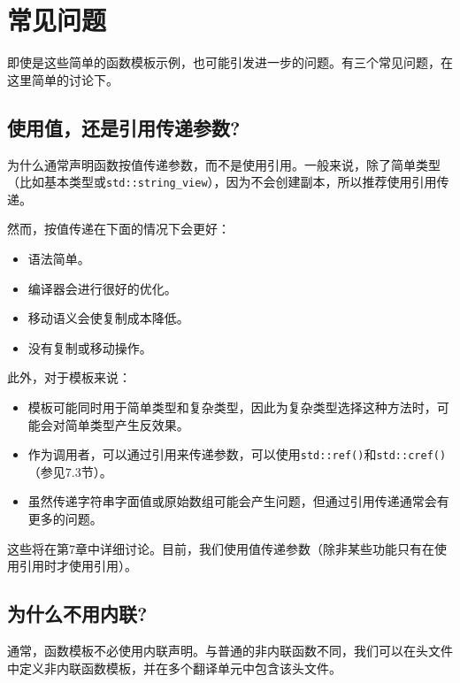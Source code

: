 \section{常见问题}

即使是这些简单的函数模板示例，也可能引发进一步的问题。有三个常见问题，在这里简单的讨论下。

\subsection{使用值，还是引用传递参数?}

为什么通常声明函数按值传递参数，而不是使用引用。一般来说，除了简单类型（比如基本类型或\texttt{std::string\_view}），因为不会创建副本，所以推荐使用引用传递。

然而，按值传递在下面的情况下会更好：

\begin{itemize}
\item
语法简单。

\item 
编译器会进行很好的优化。

\item
移动语义会使复制成本降低。

\item 
没有复制或移动操作。
\end{itemize}

此外，对于模板来说：

\begin{itemize}
\item
模板可能同时用于简单类型和复杂类型，因此为复杂类型选择这种方法时，可能会对简单类型产生反效果。

\item 
作为调用者，可以通过引用来传递参数，可以使用\texttt{std::ref()}和\texttt{std::cref()}（参见7.3节）。

\item
虽然传递字符串字面值或原始数组可能会产生问题，但通过引用传递通常会有更多的问题。
\end{itemize}

这些将在第7章中详细讨论。目前，我们使用值传递参数（除非某些功能只有在使用引用时才使用引用）。

\subsection{为什么不用内联?}
 
通常，函数模板不必使用内联声明。与普通的非内联函数不同，我们可以在头文件中定义非内联函数模板，并在多个翻译单元中包含该头文件。

